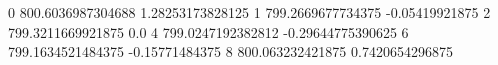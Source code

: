 0 800.6036987304688 1.28253173828125
1 799.2669677734375 -0.05419921875
2 799.3211669921875 0.0
4 799.0247192382812 -0.29644775390625
6 799.1634521484375 -0.15771484375
8 800.063232421875 0.7420654296875
